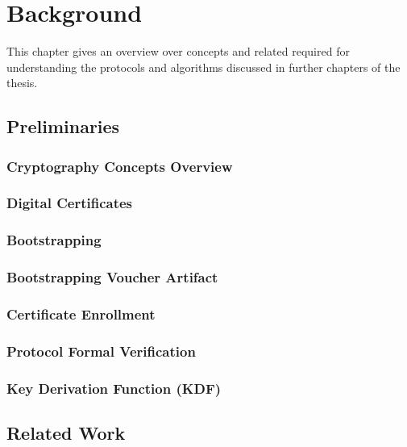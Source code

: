 \chapter{Background}
\label{ch:background}
This chapter gives an overview over concepts and related required for understanding the protocols and algorithms discussed in further chapters of the thesis.
\section{Preliminaries}

\subsection{Cryptography Concepts Overview}


\subsection{Digital Certificates}


\subsection{Bootstrapping}


\subsection{Bootstrapping Voucher Artifact}


\subsection{Certificate Enrollment}


\subsection{Protocol Formal Verification}\label{bg:pfm}


\subsection{Key Derivation Function (KDF)} \label{backgroung:kdf}



\section{Related Work}

